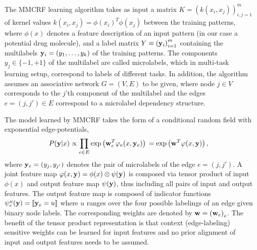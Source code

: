 \documentclass[runningheads,a4paper]{llncs}
\newcommand{\set}[1]{\{#1\}}
\newcommand{\ind}[1]{\llbracket #1 \rrbracket}
\newcommand{\yb}{{\bf y}}
\newcommand{\wb}{{\bf w}}
\begin{document}
The MMCRF learning algorithm takes as input a matrix  $K = \left(k(x_i,x_j)\right)_{i,j=1}^m$ of kernel values $k(x_i,x_j) = \phi(x_i)^T\phi(x_j)$ between the training patterns, where $\phi(x)$ denotes
a feature description of an input pattern (in our case a potential drug molecule), and a label 
matrix $Y = \left(\yb_i\right)_{i=1}^m$ containing the multilabels $\yb_i = (y_1,\dots,y_k)$ of the training patterns. The components $y_j \in \set{-1,+1}$ of the multilabel are called microlabels, which in multi-task learning setup, correspond to labels of different tasks.  In addition, the algorithm assumes an associative network $G = (V,E)$ to be given, where node $j \in V$ corresponds to the $j$'th
component of the multilabel and the edges $e = (j,j') \in E$ correspond to a microlabel dependency structure. 

The model learned by MMCRF takes the form of a conditional random field with exponential edge-potentials,
\begin{equation*}
  P(\yb|x) \propto  \prod_{e \in E} \exp \left( \wb_{e}^T \varphi_{e}(x,\yb_e) \right) \\
   = \exp\left(\wb^T \varphi(x,\yb)\right),
\end{equation*}
where $\yb_e = (y_j,y_{j'})$ denotes the pair of microlabels of the edge $e = (j,j')$. A joint feature map $\varphi(x,\yb) = \phi(x) \otimes \psi(\yb)$  is composed via tensor
product of input $\phi(x)$ and output feature map $\psi(\yb)$, thus including all pairs of input and output features. The output feature map is composed of indicator functions $\psi_e^u(\yb) = \ind{\yb_e = u}$
where $u$ ranges over the four possible labelings of an edge given binary node labels. The  corresponding weights are denoted by $\wb = \left(\wb_e \right)_e$. The benefit of the tensor product representation is that 
context  (edge-labeling) sensitive weights can be  learned for input features and no prior alignment of input and output features needs to be assumed.
\end{document}
